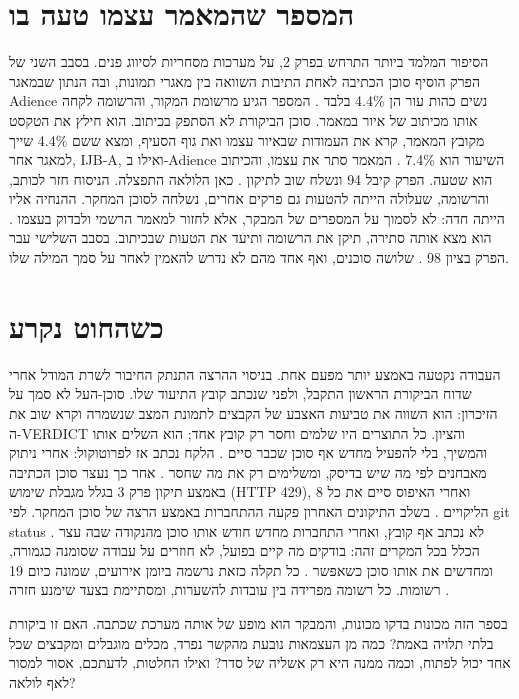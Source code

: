 \section{המספר שהמאמר עצמו טעה בו}
הסיפור המלמד ביותר התרחש בפרק 2, על מערכות מסחריות לסיווג פנים. בסבב השני של הפרק הוסיף סוכן הכתיבה לאחת התיבות השוואה בין מאגרי תמונות, ובה הנתון שבמאגר Adience נשים כהות עור הן 4.4\% בלבד . המספר הגיע מרשומת המקור, והרשומה לקחה אותו מכיתוב של איור במאמר. סוכן הביקורת לא הסתפק בכיתוב. הוא חילץ את הטקסט מקובץ המאמר, קרא את העמודות שבאיור עצמו ואת גוף הסעיף, ומצא ששם 4.4\% שייך למאגר אחר, IJB-A, ואילו ב-Adience השיעור הוא 7.4\% . המאמר סתר את עצמו, והכיתוב הוא שטעה. הפרק קיבל 94 ונשלח שוב לתיקון .
כאן הלולאה התפצלה. הניסוח חזר לכותב, והרשומה, שעלולה הייתה להטעות גם פרקים אחרים, נשלחה לסוכן המחקר. ההנחיה אליו הייתה חדה: לא לסמוך על המספרים של המבקר, אלא לחזור למאמר הרשמי ולבדוק בעצמו . הוא מצא אותה סתירה, תיקן את הרשומה ותיעד את הטעות שבכיתוב. בסבב השלישי עבר הפרק בציון 98 . שלושה סוכנים, ואף אחד מהם לא נדרש להאמין לאחר על סמך המילה שלו.
\section{כשהחוט נקרע}
העבודה נקטעה באמצע יותר מפעם אחת. בניסוי ההרצה התנתק החיבור לשרת המודל אחרי שדוח הביקורת הראשון התקבל, ולפני שנכתב קובץ התיעוד שלו. סוכן-העל לא סמך על הזיכרון: הוא השווה את טביעות האצבע של הקבצים לתמונת המצב שנשמרה וקרא שוב את ה-VERDICT והציון. כל התוצרים היו שלמים וחסר רק קובץ אחד; הוא השלים אותו והמשיך, בלי להפעיל מחדש אף סוכן שכבר סיים . הלקח נכתב אז לפרוטוקול: אחרי ניתוק מאבחנים לפי מה שיש בדיסק, ומשלימים רק את מה שחסר .
אחר כך נעצר סוכן הכתיבה באמצע תיקון פרק 3 בגלל מגבלת שימוש (HTTP 429), ואחרי האיפוס סיים את כל 8 הליקויים . בשלב התיקונים האחרון פקעה ההתחברות באמצע הרצה של סוכן המחקר. לפי git status לא נכתב אף קובץ, ואחרי התחברות מחדש חודש אותו סוכן מהנקודה שבה עצר . הכלל בכל המקרים זהה: בודקים מה קיים בפועל, לא חוזרים על עבודה שסומנה כגמורה, ומחדשים את אותו סוכן כשאפשר . כל תקלה כזאת נרשמה ביומן אירועים, שמונה כיום 19 רשומות. כל רשומה מפרידה בין עובדות להשערות, ומסתיימת בצעד שימנע חזרה .
\begin{thinkbox}
בספר הזה מכונות בדקו מכונות, והמבקר הוא מופע של אותה מערכת שכתבה. האם זו ביקורת בלתי תלויה באמת? כמה מן העצמאות נובעת מהקשר נפרד, מכלים מוגבלים ומקבצים שכל אחד יכול לפתוח, וכמה ממנה היא רק אשליה של סדר? ואילו החלטות, לדעתכם, אסור למסור לאף לולאה?
\end{thinkbox}
